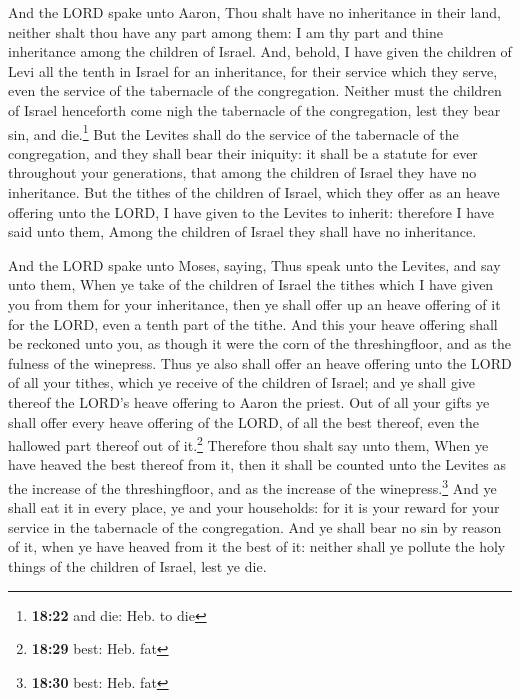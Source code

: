  And the LORD spake unto Aaron, Thou shalt have no
inheritance in their land, neither shalt thou have any part among them:
I am thy part and thine inheritance among the children of Israel.
 And, behold, I have given the children of Levi all the
tenth in Israel for an inheritance, for their service which they serve,
even the service of the tabernacle of the congregation. 
Neither must the children of Israel henceforth come nigh the tabernacle
of the congregation, lest they bear sin, and die.\footnote{\textbf{18:22}
  and die: Heb. to die}  But the Levites shall do the
service of the tabernacle of the congregation, and they shall bear their
iniquity: it shall be a statute for ever throughout your generations,
that among the children of Israel they have no inheritance.
 But the tithes of the children of Israel, which they
offer as an heave offering unto the LORD, I have given to the Levites to
inherit: therefore I have said unto them, Among the children of Israel
they shall have no inheritance.

 And the LORD spake unto Moses, saying, 
Thus speak unto the Levites, and say unto them, When ye take of the
children of Israel the tithes which I have given you from them for your
inheritance, then ye shall offer up an heave offering of it for the
LORD, even a tenth part of the tithe.  And this your
heave offering shall be reckoned unto you, as though it were the corn of
the threshingfloor, and as the fulness of the winepress. 
Thus ye also shall offer an heave offering unto the LORD of all your
tithes, which ye receive of the children of Israel; and ye shall give
thereof the LORD's heave offering to Aaron the priest. 
Out of all your gifts ye shall offer every heave offering of the LORD,
of all the best thereof, even the hallowed part thereof out of
it.\footnote{\textbf{18:29} best: Heb. fat}  Therefore
thou shalt say unto them, When ye have heaved the best thereof from it,
then it shall be counted unto the Levites as the increase of the
threshingfloor, and as the increase of the winepress.\footnote{\textbf{18:30}
  best: Heb. fat}  And ye shall eat it in every place, ye
and your households: for it is your reward for your service in the
tabernacle of the congregation.  And ye shall bear no sin
by reason of it, when ye have heaved from it the best of it: neither
shall ye pollute the holy things of the children of Israel, lest ye die.

